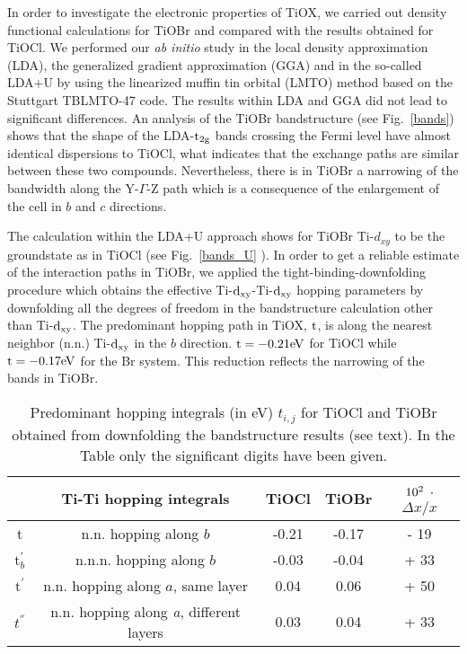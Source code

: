 \documentclass[prb,preprint,draft,amsmath,showpacs]{revtex4}
\begin{document}
In order to investigate the electronic properties of TiOX, we carried out density
functional calculations for TiOBr  and compared with the results obtained for
TiOCl\cite{seidel03,valenti03}. We performed our {\it ab initio} study in the local
density approximation (LDA), the generalized gradient approximation (GGA)\cite{perdew96}
and in the so-called LDA+U\cite{anisimov97} by using the linearized muffin tin orbital
(LMTO) method based on the Stuttgart TBLMTO-47 code\cite{andersen75}. The results within
LDA and GGA did not lead to significant differences.  An analysis of the TiOBr
bandstructure (see Fig.\ \ref{bands}) shows that the shape of the LDA-$\rm t_{2g}$ bands
crossing the Fermi level have almost identical dispersions to
TiOCl\cite{seidel03,valenti03}, what indicates that the exchange paths are similar
between these two compounds. Nevertheless, there is in TiOBr a narrowing of the
bandwidth along the Y-$\Gamma$-Z path which is a consequence of the enlargement of the
cell in $b$ and $c$ directions.

The calculation within the LDA+U approach shows for TiOBr Ti-$d_{xy}$ to be the
groundstate as in TiOCl (see Fig.\ \ref{bands_U} ). In order to get a reliable estimate
of the interaction paths in TiOBr, we applied the tight-binding-downfolding
procedure\cite{saha-dasgupta00,valenti03} which obtains the effective Ti-$\rm
d_{xy}$-Ti-$\rm d_{xy}$ hopping parameters by downfolding all the degrees of freedom in
the bandstructure calculation other than Ti-$\rm d_{xy}$. The predominant hopping path
in TiOX, $\rm t$, is along the nearest neighbor (n.n.) Ti-$\rm d_{xy}$ in the $b$
direction. $\rm t=-0.21eV$ for TiOCl while $\rm t=-0.17eV$ for the Br system. This
reduction reflects the narrowing of the bands in TiOBr.

\begin{table}
\caption{Predominant hopping integrals (in eV) $t_{i,j}$ for TiOCl and TiOBr obtained
from downfolding the bandstructure results (see text). In the Table only the significant
digits have been given.} \label{parameters}\begin{center}
\begin{tabular}{|c c|c|c|c|}
\hline

          & Ti-Ti hopping integrals                        & TiOCl & TiOBr  & $\rm 10^2$ $\cdot$ $\Delta x/x$\\
          \hline \hline
     t        & n.n. hopping along $b$                         & -0.21 &  -0.17 & - 19 \\
  t$^{'}_{b}$ & n.n.n. hopping along $b$                   & -0.03 &  -0.04 & + 33 \\  \hline\hline
      t$^{'}$ &   n.n. hopping along $a$, same layer           & 0.04  &  0.06  & + 50 \\
     $t^{''}$ & n.n. hopping along \emph{a}, different layers  &  0.03  &  0.04  & + 33 \\
  \hline\hline
\end{tabular}
\end{center}

\end{table}
\end{document}
